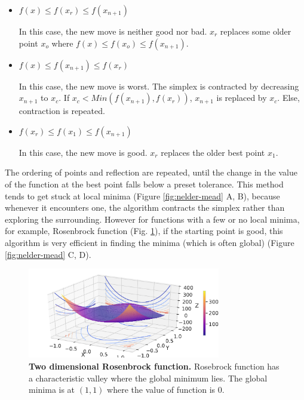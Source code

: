\begin{itemize}
  \item $f(x) \leq f(x_r) \leq f(x_{n+1})$
  
  In this case, the new move is neither good nor bad. $x_r$ replaces some older point $x_o$ where $f(x) \leq f(x_o) \leq f(x_{n+1})$.
  
  \item $f(x) \leq f(x_{n+1}) \leq f(x_r) $
  
  In this case, the new move is worst. The simplex is contracted by decreasing $x_{n+1}$ to $x_c$. If $x_c < Min(f(x_{n+1}), f(x_r))$, $x_{n+1}$ is replaced by $x_c$. Else, contraction is repeated.
  
  \item $f(x_r) \leq f(x_1) \leq f(x_{n+1}) $
  
  In this case, the new move is good. $x_r$ replaces the older best point $x_1$. 
\end{itemize}

The ordering of points and reflection are repeated, until the change in the value of the function at the best point falls below a preset tolerance. This method tends to get stuck at local minima (Figure \ref{fig:nelder-mead} A, B), because whenever it encounters one, the algorithm contracts the simplex rather than exploring the surrounding. However for functions with a few or no local minima, for example, Rosenbrock function (Fig. \ref{fig:rosen}), if the starting point is good, this algorithm is very efficient in finding the minima (which is often global) (Figure \ref{fig:nelder-mead} C, D).


\begin{figure}[H]
\center
\includegraphics[width=0.75\textwidth]{chapters/Introduction/Figures/rosen.pdf}
\caption[Two dimensional Rosenbrock function.]{\textbf{Two dimensional Rosenbrock function.} Rosebrock function has a characteristic valley where the global minimum lies. The global minima is at $(1, 1)$ where the value of function is $0$.}%
\label{fig:rosen}
\end{figure}

